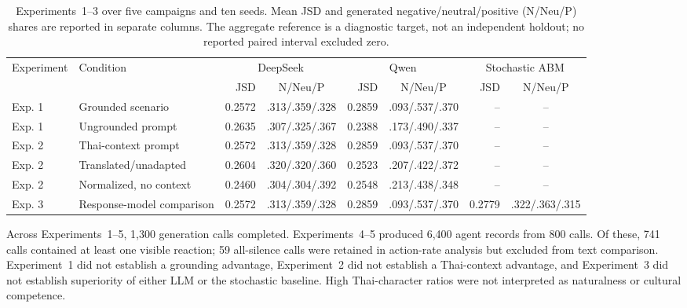 \documentclass[conference]{IEEEtran}
\begin{document}
\begin{table}[t]
\caption{Experiments~1--3 over five campaigns and ten seeds. Mean JSD and
generated negative/neutral/positive (N/Neu/P) shares are reported in separate
columns. The aggregate reference is a diagnostic target, not an independent
holdout; no reported paired interval excluded zero.}
\label{tab:exp13-results}
\centering
\scriptsize
\begin{tabular}{@{}llrcrcrc@{}}
\toprule
Experiment & Condition & \multicolumn{2}{c}{DeepSeek} &
\multicolumn{2}{c}{Qwen} & \multicolumn{2}{c}{Stochastic ABM} \\
\cmidrule(lr){3-4}\cmidrule(lr){5-6}\cmidrule(l){7-8}
& & JSD & N/Neu/P & JSD & N/Neu/P & JSD & N/Neu/P \\
\midrule
Exp. 1 & Grounded scenario & 0.2572 & .313/.359/.328 &
0.2859 & .093/.537/.370 & -- & -- \\
Exp. 1 & Ungrounded prompt & 0.2635 & .307/.325/.367 &
0.2388 & .173/.490/.337 & -- & -- \\
Exp. 2 & Thai-context prompt & 0.2572 & .313/.359/.328 &
0.2859 & .093/.537/.370 & -- & -- \\
Exp. 2 & Translated/unadapted & 0.2604 & .320/.320/.360 &
0.2523 & .207/.422/.372 & -- & -- \\
Exp. 2 & Normalized, no context & 0.2460 & .304/.304/.392 &
0.2548 & .213/.438/.348 & -- & -- \\
Exp. 3 & Response-model comparison & 0.2572 & .313/.359/.328 &
0.2859 & .093/.537/.370 & 0.2779 & .322/.363/.315 \\
\bottomrule
\end{tabular}
\end{table}

Across Experiments~1--5, 1,300 generation calls completed. Experiments~4--5
produced 6,400 agent records from 800 calls. Of these, 741 calls contained at
least one visible reaction; 59 all-silence calls were retained in action-rate
analysis but excluded from text comparison. Experiment~1 did not establish a
grounding advantage, Experiment~2 did not establish a Thai-context advantage,
and Experiment~3 did not establish superiority of either LLM or the stochastic
baseline. High Thai-character ratios were not interpreted as naturalness or
cultural competence.
\end{document}
